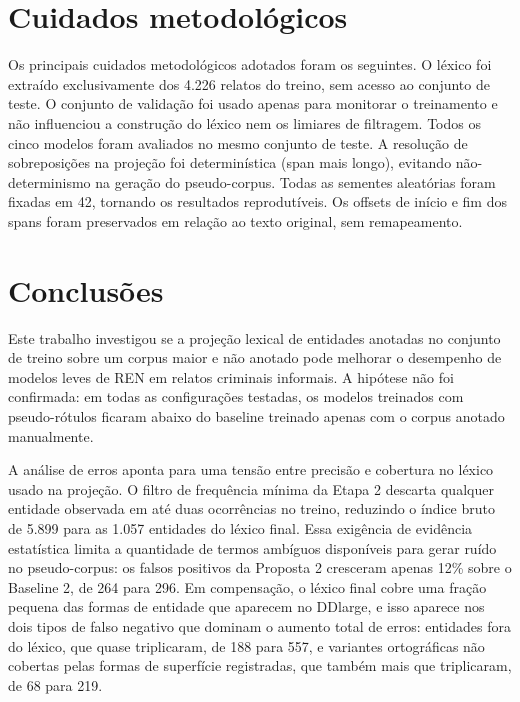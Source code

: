 \documentclass[12pt,a4paper]{article}
\begin{document}
\section{Cuidados metodológicos}

Os principais cuidados metodológicos adotados foram os seguintes. O léxico foi
extraído exclusivamente dos 4.226 relatos do treino, sem acesso ao conjunto de
teste. O conjunto de validação foi usado apenas para monitorar o treinamento e
não influenciou a construção do léxico nem os limiares de filtragem. Todos os
cinco modelos foram avaliados no mesmo conjunto de teste. A resolução de sobreposições
na projeção foi determinística (span mais longo), evitando não-determinismo
na geração do pseudo-corpus. Todas as sementes aleatórias foram fixadas em 42,
tornando os resultados reprodutíveis. Os offsets de início e fim dos spans foram
preservados em relação ao texto original, sem remapeamento.

\section{Conclusões}

Este trabalho investigou se a projeção lexical de entidades anotadas no conjunto
de treino sobre um corpus maior e não anotado pode melhorar o desempenho de
modelos leves de REN em relatos criminais informais. A hipótese não foi
confirmada: em todas as configurações testadas, os modelos treinados com
pseudo-rótulos ficaram abaixo do baseline treinado apenas com o corpus anotado
manualmente.

A análise de erros aponta para uma tensão entre precisão e cobertura no
léxico usado na projeção. O filtro de frequência mínima da Etapa 2 descarta
qualquer entidade observada em até duas ocorrências no treino, reduzindo o
índice bruto de 5.899 para as 1.057 entidades do léxico final. Essa exigência
de evidência estatística limita a quantidade de termos ambíguos disponíveis
para gerar ruído no pseudo-corpus: os falsos positivos da Proposta 2
cresceram apenas 12\% sobre o Baseline 2, de 264 para 296. Em compensação, o
léxico final cobre uma fração pequena das formas de entidade que aparecem no
DDlarge, e isso aparece nos dois tipos de falso negativo que dominam o
aumento total de erros: entidades fora do léxico, que quase triplicaram, de
188 para 557, e variantes ortográficas não cobertas pelas formas de
superfície registradas, que também mais que triplicaram, de 68 para 219.
\end{document}
